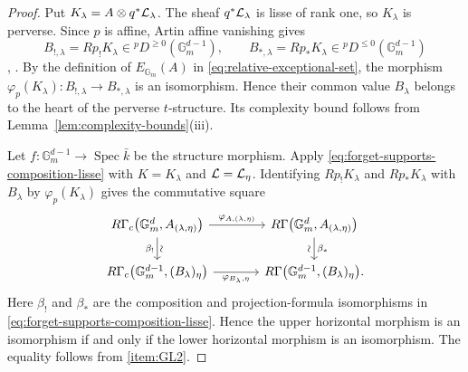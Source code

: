 \documentclass[12pt,reqno]{amsart}
\theoremstyle{definition}
\theoremstyle{plain}
\theoremstyle{definition}
\theoremstyle{remark}
\newcommand{\bbG}{\mathbb{G}}  \newcommand{\bbH}{\mathbb{H}}
\newcommand{\Gm}{\bbG_m}
\begin{document}
\begin{proof}
Put \(K_\lambda=A\otimes q^*\mathcal{L}_\lambda\).  The sheaf \(q^*\mathcal{L}_\lambda\) is lisse of rank one, so
\(K_\lambda\) is perverse.  Since \(p\) is affine, Artin affine vanishing gives
\[
        B_{!,\lambda}=Rp_!K_\lambda\in{}^pD^{\ge0}(\Gm^{d-1}),
        \qquad
        B_{*,\lambda}=Rp_*K_\lambda\in{}^pD^{\le0}(\Gm^{d-1})
\]
\cite[Th.~4.1.1, Cor.~4.1.2]{BBDG18}, \cite[Exp.~XIV, 3.1]{SGA4}.  By the definition of
\(E_{\Gm}(A)\) in \eqref{eq:relative-exceptional-set}, the morphism
\(\varphi_p(K_\lambda)\colon B_{!,\lambda}\to B_{*,\lambda}\) is an isomorphism.  Hence their common value
\(B_\lambda\) belongs to the heart of the perverse \(t\)-structure.  Its complexity bound follows from
Lemma~\ref{lem:complexity-bounds}(iii).

Let \(f\colon\Gm^{d-1}\to\operatorname{Spec}\bar k\) be the structure morphism.  Apply
\eqref{eq:forget-supports-composition-lisse} with \(K=K_\lambda\) and \(\mathcal{L}=\mathcal{L}_\eta\).  Identifying
\(Rp_!K_\lambda\) and \(Rp_*K_\lambda\) with \(B_\lambda\) by \(\varphi_p(K_\lambda)\) gives the
commutative square
\[
\begin{tikzcd}[column sep=large]
R\Gamma_c\bigl(\Gm^d,A_{(\lambda,\eta)}\bigr)
  \arrow[r,"\varphi_{A,(\lambda,\eta)}"]
  \arrow[d,"\beta_!"',"\rotatebox{90}{\(\sim\)}"] &
R\Gamma\bigl(\Gm^d,A_{(\lambda,\eta)}\bigr)
  \arrow[d,"\beta_*","\rotatebox{90}{\(\sim\)}"'] \\
R\Gamma_c\bigl(\Gm^{d-1},(B_\lambda)_\eta\bigr)
  \arrow[r,"\varphi_{B_\lambda,\eta}"'] &
R\Gamma\bigl(\Gm^{d-1},(B_\lambda)_\eta\bigr).
\end{tikzcd}
\]
Here \(\beta_!\) and \(\beta_*\) are the composition and projection-formula isomorphisms in
\eqref{eq:forget-supports-composition-lisse}.  Hence the upper horizontal morphism is an isomorphism if
and only if the lower horizontal morphism is an isomorphism.  The equality follows from
\ref{item:GL2}.
\end{proof}
\end{document}
